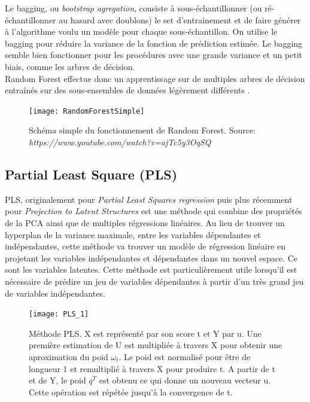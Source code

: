 \noindent Le bagging\label{bagging}, ou \textit{bootstrap agregation}, consiste à sous-échantillonner (ou ré-échantillonner au hasard avec doublons) le set d'entrainement et de faire générer à l’algorithme voulu un modèle pour chaque sous-échantillon. On utilise le bagging pour réduire la variance de la fonction de prédiction estimée. Le bagging semble bien fonctionner pour les procédures avec une grande variance et un petit biais, comme les arbres de décision. \cite{hastie_09_elements-of.statistical-learning}\\


\noindent Random Forest effectue donc un apprentissage sur de multiples arbres de décision entraînés sur des sous-ensembles de données légèrement différents \cite{Statistics01randomforests}.


\begin{figure}[H]
	\texttt{[image: RandomForestSimple]}
	\caption{\label{RandomForestSchema} Schéma simple du fonctionnement de Random Forest. \newline Source: \textit{https://www.youtube.com/watch?v=ajTc5y3OqSQ}}
\end{figure}

\subsection{Partial Least Square (PLS)} 


PLS, originalement pour \textit{Partial Least Squares regression} puis plus récemment pour \textit{Projection to Latent Structures} est une méthode qui combine des propriétés de la PCA ainsi que de multiples régressions linéaires. Au lieu de trouver un hyperplan de la variance maximale, entre les variables dépendantes et indépendantes, cette méthode va trouver un modèle de régression linéaire en projetant les variables indépendantes et dépendantes dans un nouvel espace. Ce sont les variables latentes. Cette méthode est particulièrement utile lorsqu'il est nécessaire de prédire un jeu de variables dépendantes à partir d'un très grand jeu de variables indépendantes.  

\begin{figure}[H] 
	\centering
	\texttt{[image: PLS\_1]} 
	\caption{\label{PLSschema}Méthode PLS. X est représenté par son score t et Y par u. Une première estimation de U est multipliée à travers X pour obtenir une aproximation du poid $ \omega_t $. Le poid est normalisé pour être de longueur 1 et remultiplié à travers X pour produire t. A partir de t et de Y, le poid $ q^T $ est obtenu ce qui donne un nouveau vecteur u. Cette opération est répétée jusqu'à la convergence de t.\cite{CEM:CEM515}} 
\end{figure} 

